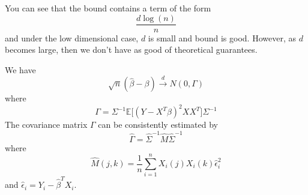   You can see that the bound contains a term of the form 
  \begin{equation}
    \frac{d \log(n)}{n}
  \end{equation}
  and under the low dimensional case, $d$ is small and bound is good. However, as $d$ becomes large, then we don't have as good of theoretical guarantees. 

  \begin{theorem}
    We have 
    \begin{equation}
      \sqrt{n} (\hat{\beta} - \beta) \xrightarrow{d} N(0, \Gamma) 
    \end{equation}
    where 
    \begin{equation}
      \Gamma = \Sigma^{-1} \mathbb{E} \big[ (Y - X^T \beta)^2 X X^T \big] \Sigma^{-1}
    \end{equation}
    The covariance matrix $\Gamma$ can be consistently estimated by 
    \begin{equation}
      \hat{\Gamma} = \hat{\Sigma}^{-1} \hat{M} \hat{\Sigma}^{-1}
    \end{equation}
    where 
    \begin{equation}
      \hat{M} (j, k) = \frac{1}{n} \sum_{i=1}^n X_i (j) X_i (k) \hat{\epsilon}_i^2
    \end{equation}
    and $\hat{\epsilon}_i = Y_i - \hat{\beta}^T X_i$.
  \end{theorem}

